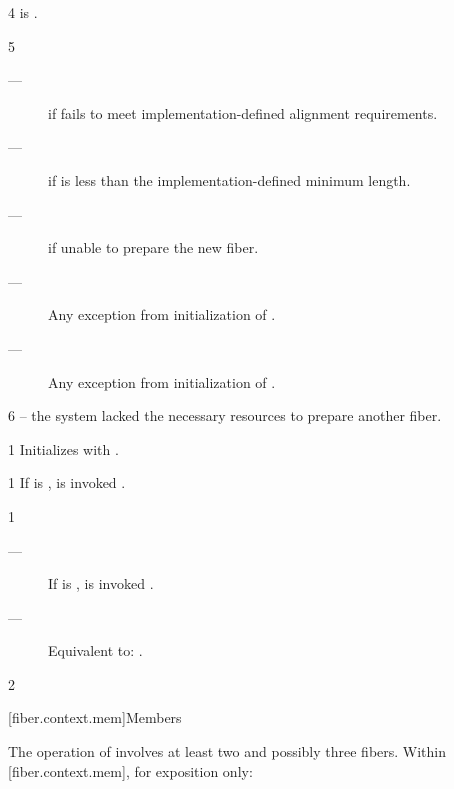4 \postcond
\emptyfn is \false.

5 \except
\begin{description}
    \item[---]  if  fails to meet
               implementation-defined alignment requirements.
    \item[---]  if  is less than the
               implementation-defined minimum length.
    \item[---]  if unable to prepare the new fiber.
    \item[---] Any exception from initialization of .
    \item[---] Any exception from initialization of .
\end{description}

6 \errors
{} -- the system lacked the necessary resources to prepare another fiber.


1 \effects
Initializes  with .


1 \effects
If \emptyfn is \false,  is invoked .


1 \effects
\begin{description}
    \item[---] If \emptyfn is \false,  is invoked .
    \item[---] Equivalent to: .
\end{description}

2 \returns
\this

[fiber.context.mem]{Members}

The operation of \resumewith involves at least two and possibly three fibers.
Within [fiber.context.mem], for exposition only:

